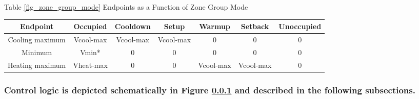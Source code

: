 \documentclass[10pt]{article}
\begin{document}
\label{fig_zone_group_mode}
\begin{center}
Table \ref{fig_zone_group_mode} Endpoints as a Function of Zone Group Mode 
\end{center}
%
\begin{tabular}{ c|c|c|c|c|c|c } 
 \hline
 Endpoint & Occupied & Cooldown & Setup & Warmup & Setback & Unoccupied \\ 
 \hline
 Cooling maximum & Vcool-max & Vcool-max & Vcool-max & 0 & 0 & 0 \\ 
 \hline
 Minimum & Vmin* & 0 & 0 & 0 & 0 & 0 \\ 
 \hline
 Heating maximum & Vheat-max & 0 & 0 & Vcool-max & Vcool-max & 0 \\ 
 \hline
\end{tabular}

\subsubsection{Control logic is depicted schematically in Figure \ref{fig_control_logic} and described in the following subsections.} \label{fig_control_logic}

\begin{figure}[h]
  \centering
  
\end{figure}

\ifdefined\BuildingsTemplatesAirHandlersFansInterfacesPartialAirHandlertypFanRet
\fi
\end{document}
